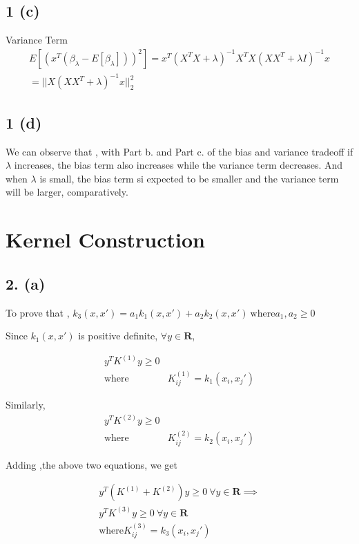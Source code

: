 \documentclass[10pt,letterpaper]{article}
\begin{document}
\subsection{1 (c) } Variance Term
	\begin{align*}
	E  [ (x^T (\beta_\lambda − E[\beta_\lambda]))^2]  = x^T( X^T X + \lambda )^{-1} X^T X(XX^T + \lambda I)^{-1}x\\
	 = ||X(XX^T + \lambda)^{-1}x||^2_2
	\end{align*}


\subsection{1 (d) }
We can observe that , with Part b. and Part c. of the bias and variance tradeoff  if $\lambda$ increases, the bias
term also increases while the variance term decreases. And when $\lambda$ is small, the bias
term si expected to be smaller and the variance term will be larger, comparatively. 

\section {Kernel Construction}
\subsection{2. (a) }

To prove that , $k_3(x,x') = a_1k_1(x,x')+a_2k_2(x,x')\ \text{where} a_1,a_2\geq 0$
			
			Since $k_1(x,x')$ is positive definite, $\forall y \in \mathbf{R}$, 
			
			\begin{align*}
			y^TK^{(1)}y \geq 0 \\
			\text{where }	&K^{(1)}_{ij} = k_1(x_i,x_j')
			\end{align*}
			
			Similarly,
			\begin{align*}
			y^TK^{(2)}y \geq 0 \\
			\text{where }	&K^{(2)}_{ij} = k_2(x_i,x_j')
			\end{align*}
			
			Adding ,the above two equations, we get
			
			\begin{align*}
			y^T(K^{(1)}+K^{(2)})y \geq 0\  \forall y \in \mathbf{R}
			\implies\\
			y^TK^{(3)}y \geq 0\  \forall y \in \mathbf{R}\\
			\text{where} 	K^{(3)}_{ij} = k_3(x_i,x_j')
			\end{align*}
\end{document}
